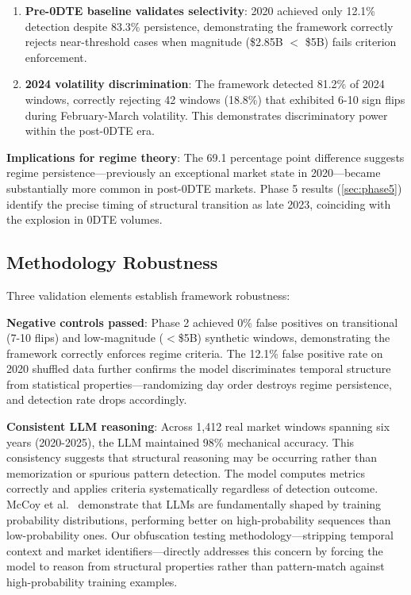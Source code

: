 \vspace{0.1cm}

\begin{enumerate}
\item \textbf{Pre-0DTE baseline validates selectivity}: 2020 achieved only 12.1\% detection despite 83.3\% persistence, demonstrating the framework correctly rejects near-threshold cases when magnitude (\$2.85B $<$ \$5B) fails criterion enforcement.

\item \textbf{2024 volatility discrimination}: The framework detected 81.2\% of 2024 windows, correctly rejecting 42 windows (18.8\%) that exhibited 6-10 sign flips during February-March volatility. This demonstrates discriminatory power within the post-0DTE era.
\end{enumerate}

\vspace{0.2cm}

\noindent\textbf{Implications for regime theory}: The 69.1 percentage point difference suggests regime persistence—previously an exceptional market state in 2020—became substantially more common in post-0DTE markets. Phase 5 results (\ref{sec:phase5}) identify the precise timing of structural transition as late 2023, coinciding with the explosion in 0DTE volumes.

\subsection{Methodology Robustness}

\vspace{0.2cm}

Three validation elements establish framework robustness:

\vspace{0.2cm}

\noindent\textbf{Negative controls passed}: Phase 2 achieved 0\% false positives on transitional (7-10 flips) and low-magnitude ($<$\$5B) synthetic windows, demonstrating the framework correctly enforces regime criteria. The 12.1\% false positive rate on 2020 shuffled data further confirms the model discriminates temporal structure from statistical properties—randomizing day order destroys regime persistence, and detection rate drops accordingly.

\vspace{0.2cm}

\noindent\textbf{Consistent LLM reasoning}: Across 1,412 real market windows spanning six years (2020-2025), the LLM maintained 98\% mechanical accuracy. This consistency suggests that structural reasoning may be occurring rather than memorization or spurious pattern detection. The model computes metrics correctly and applies criteria systematically regardless of detection outcome. McCoy et al.~\citep{mccoy2023embers} demonstrate that LLMs are fundamentally shaped by training probability distributions, performing better on high-probability sequences than low-probability ones. Our obfuscation testing methodology—stripping temporal context and market identifiers—directly addresses this concern by forcing the model to reason from structural properties rather than pattern-match against high-probability training examples.

